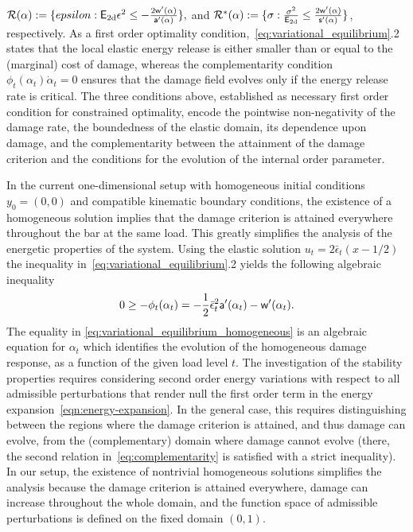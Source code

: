 \documentclass[10pt]{article}
\begin{document}
$\mathcal{R}(\alpha):=\{epsilon: \mathsf{E_{\text{2d}}} \epsilon^2 \leq -\frac{2 \mathsf{w}'(\alpha)}{\mathsf{a}'(\alpha)}\},$ and $
\mathcal{R}^*(\alpha):=\{\sigma: \frac{\sigma^2}{\mathsf{E_{\text{2d}}}} \leq \frac{2 \mathsf{w}'(\alpha)}{\mathsf{s}'(\alpha)}\}$, respectively.
%
%
As a first order optimality condition,~\eqref{eq:variational_equilibrium}.2 states that the local elastic energy release is either smaller than or equal to the (marginal) cost of damage, whereas the complementarity condition $\phi_t(\alpha_t)\dot \alpha_t = 0$ ensures that the damage field evolves only if the energy release rate is critical.
The three conditions above, established as necessary first order condition for constrained optimality, encode the pointwise non-negativity of the damage rate, the boundedness of the elastic domain, its dependence upon damage, and the complementarity between the attainment of the damage criterion and the conditions for the evolution of the internal order parameter. 

In the current one-dimensional setup with homogeneous initial conditions $y_0=(0, 0)$ and compatible kinematic boundary conditions, the existence of a homogeneous solution implies that the damage criterion is attained everywhere throughout the bar at the same load. This greatly simplifies the analysis of the energetic properties of the system. 
Using the elastic solution $u_t = 2\bar \epsilon_t(x-1/2)$ 
%
 the inequality in~\eqref{eq:variational_equilibrium}.2 yields the following algebraic inequality
\begin{equation}
    \label{eq:variational_equilibrium_homogeneous}
    0 \geq -\phi_t(\alpha_t)= -\frac{1}{2}\bar \epsilon_t^2 \mathsf{a}'(\alpha_t)-\mathsf{w}'(\alpha_t).
\end{equation}
%
%
%
%
%
%
The equality in \eqref{eq:variational_equilibrium_homogeneous} is an algebraic equation for $\alpha_t$ which identifies the evolution of the homogeneous damage response, as a function of the given load level $t$.
The investigation of the stability properties requires  
considering second order energy variations with respect to all admissible perturbations that render null the first order term in the energy expansion~\eqref{eqn:energy-expansion}.
In the general case, this requires distinguishing between the regions where the damage criterion is attained, and thus damage can evolve, from the (complementary) domain where damage cannot evolve (there, the second relation in~\eqref{eq:complementarity} is satisfied with a strict inequality).
In our setup, the existence of nontrivial homogeneous solutions simplifies the analysis because the damage criterion is attained everywhere, damage can increase throughout the whole domain, and the function space of admissible perturbations is defined on the fixed domain $(0, 1)$.
\end{document}
